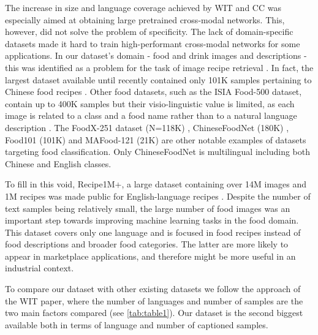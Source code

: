 \documentclass[10pt,twocolumn,letterpaper]{article}
\begin{document}
The increase in size and language coverage achieved by WIT and CC was especially aimed at obtaining large pretrained cross-modal networks. This, however, did not solve the problem of specificity. The lack of domain-specific datasets made it hard to train high-performant cross-modal networks for some applications. In our dataset's domain - food and drink images and descriptions - this was identified as a problem for the task of image recipe retrieval \cite{salvador2017learning}. In fact, the largest dataset available until recently contained only 101K samples pertaining to Chinese food recipes \cite{chen2016deep}. Other food datasets, such as the ISIA Food-500 dataset, contain up to 400K samples but their visio-linguistic value is limited, as each image is related to a class and a food name rather than to a natural language description \cite{min2020isia}. The FoodX-251 dataset (N=118K) \cite{kaur2019foodx}, ChineseFoodNet (180K) \cite{chen2017chinesefoodnet}, Food101 (101K) \cite{bossard2014food} and MAFood-121 (21K) \cite{aguilar2019regularized} are other notable examples of datasets targeting food classification. Only ChineseFoodNet is multilingual including both Chinese and English classes.

To fill in this void, Recipe1M+, a large dataset containing over 14M images and 1M recipes was made public for English-language recipes \cite{marin2019recipe1m+}. Despite the number of text samples being relatively small, the large number of food images was an important step towards improving machine learning tasks in the food domain. This dataset covers only one language and is focused in food recipes instead of food descriptions and broader food categories. The latter are more likely to appear in marketplace applications, and therefore might be more useful in an industrial context. 

To compare our dataset with other existing datasets we follow the approach of the WIT paper, where the number of languages and number of samples are the two main factors compared (see \cref{tab:table1}). Our dataset is the second biggest available both in terms of language and number of captioned samples.
\end{document}

